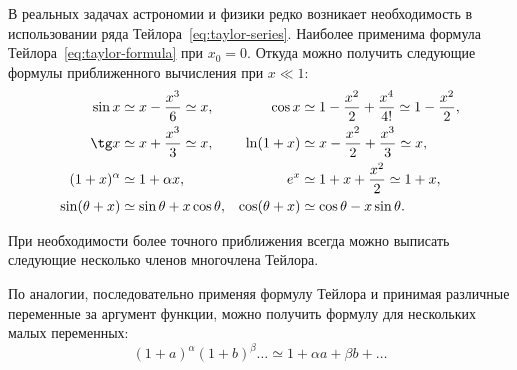В реальных задачах астрономии и физики редко возникает необходимость в использовании ряда Тейлора~\eqref{eq:taylor-series}. Наиболее применима формула Тейлора~\eqref{eq:taylor-formula} при $x_0 = 0$. Откуда можно получить следующие формулы приближенного вычисления при $x \ll 1$:
\begin{align*}
    \sin x &\simeq x - \frac{x^3}{6} \simeq x, &
    \cos x &\simeq 1 - \frac{x^2}{2} + \frac{x^4}{4!} \simeq 1 - \frac{x^2}{2}, \\
    \tg x &\simeq x + \frac{x^3}{3} \simeq x, &
    \ln(1+x) &\simeq x - \frac{x^2}{2} + \frac{x^3}{3} \simeq x, \\
    (1 + x)^\alpha &\simeq 1 + \alpha x, &
    e^x &\simeq 1 + x + \frac{x^2}{2} \simeq 1 + x, \\
    \sin (\theta + x) &\simeq \sin \theta + x \cos \theta, &
    \cos(\theta + x) &\simeq \cos \theta - x \sin \theta.
\end{align*}
\begin{wrapfigure}{r}{0.47\tw}
    \centering
    \vspace{-1pc}
    \caption{}
    \label{pic:math-approx}
\end{wrapfigure}
При необходимости более точного приближения всегда можно выписать следующие несколько членов многочлена Тейлора. 

По аналогии, последовательно применяя формулу Тейлора и принимая различные переменные за аргумент функции, можно получить формулу для нескольких малых переменных:
\begin{equation*}
    (1 + a)^\alpha (1 + b)^\beta \ldots \simeq 1 + \alpha a + \beta b + \ldots
\end{equation*}
